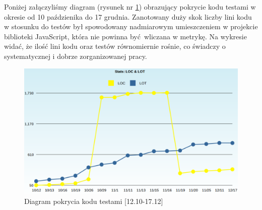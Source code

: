     Poniżej załączyliśmy diagram (rysunek nr \ref{fig:graph}) obrazujący pokrycie kodu testami w okresie od 10 paździenika do 17 grudnia. Zanotowany duży skok liczby lini kodu w stosunku do testów był spowodowany nadmiarowym umieszczeniem w projekcie biblioteki JavaScript, która nie powinna być wliczana w metrykę.
    Na wykresie widać, że ilość lini kodu oraz testów równomiernie rośnie, co świadczy o systematycznej i dobrze zorganizowanej pracy.
    \begin{figure}[h]
      \centering
      \includegraphics[scale=0.35]{images/LOC.png}
      \caption{Diagram pokrycia kodu testami [12.10-17.12]}
      \label{fig:graph}
    \end{figure}
  \clearpage
